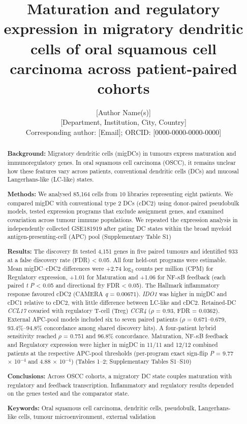 \documentclass[11pt,a4paper]{article}
\title{Maturation and regulatory expression in migratory dendritic cells of oral squamous cell carcinoma across patient-paired cohorts}
\author{[Author Name(s)]\\ \small [Department, Institution, City, Country]\\ \small Corresponding author: [Email]; ORCID: [0000-0000-0000-0000]}
\date{}
\begin{document}
\maketitle

\begin{abstract}
\noindent\textbf{Background:} Migratory dendritic cells (migDCs) in tumours express maturation and immunoregulatory genes. In oral squamous cell carcinoma (OSCC), it remains unclear how these features vary across patients, conventional dendritic cells (DCs) and mucosal Langerhans-like (LC-like) states.\par\medskip
\noindent\textbf{Methods:} We analysed 85,164 cells from 10 libraries representing eight patients. We compared migDC with conventional type 2 DCs (cDC2) using donor-paired pseudobulk models, tested expression programs that exclude assignment genes, and examined covariation across tumour immune populations. We repeated the expression analysis in independently collected GSE181919 after gating DC states within the broad myeloid antigen-presenting-cell (APC) pool (Supplementary Table S1)\par\medskip
\noindent\textbf{Results:} The discovery fit tested 4,151 genes in five paired tumours and identified 933 at a false discovery rate (FDR) < 0.05. All four held-out programs were estimable. Mean migDC--cDC2 differences were +2.74 log$_{2}$ counts per million (CPM) for Regulatory expression, +1.01 for Maturation and +1.06 for NF-$\kappa$B feedback (each paired \textit{t} \textit{P} < 0.05 and directional fry FDR < 0.05). The Hallmark inflammatory response favoured cDC2 (CAMERA \textit{q} = 0.00671). \textit{IDO1} was higher in migDC and cDC1 relative to cDC2, with little difference between LC-like and cDC2. Retained-DC \textit{CCL17} covaried with regulatory T-cell (Treg) \textit{CCR4} ($\rho$ = 0.93, FDR = 0.0362). External APC-pool models included six to seven paired patients ($\rho$ = 0.671--0.679, 93.4\%--94.8\% concordance among shared discovery hits). A four-patient hybrid sensitivity reached $\rho$ = 0.751 and 96.8\% concordance. Maturation, NF-$\kappa$B feedback and Regulatory expression were higher in migDC in 11/11 and 12/12 combined patients at the respective APC-pool thresholds (per-program exact sign-flip \textit{P} = 9.77 $\times$ 10$^{-4}$ and 4.88 $\times$ 10$^{-4}$) (Tables 1--2; Supplementary Tables S1--S10)\par\medskip
\noindent\textbf{Conclusions:} Across OSCC cohorts, a migratory DC state couples maturation with regulatory and feedback transcription. Inflammatory and regulatory results depended on the genes tested and the comparator state.\par\medskip
\noindent\textbf{Keywords:} Oral squamous cell carcinoma, dendritic cells, pseudobulk, Langerhans-like cells, tumour microenvironment, external validation
\end{abstract}
\end{document}
